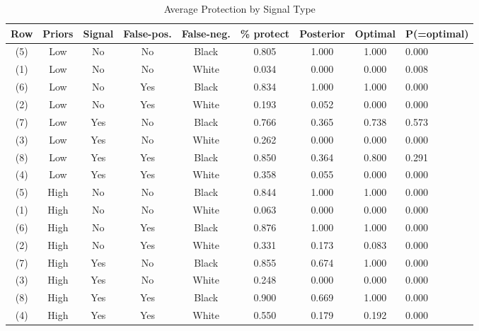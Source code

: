 \begin{table}[H]\centering \footnotesize \caption{Average Protection by Signal Type} \begin{tabular}{cccccccc} \hline \hline
\textbf{Row}&\textbf{Priors}&\textbf{Signal}&\textbf{False-pos.}&\textbf{False-neg.}&\textbf{\% protect}& \textbf{Posterior} & \textbf{Optimal} & \textbf{P(=optimal)} \\ \hline
(5)&Low&No&No&Black&0.805&1.000&1.000&0.000\\
(1)&Low&No&No&White&0.034&0.000&0.000&0.008\\
(6)&Low&No&Yes&Black&0.834&1.000&1.000&0.000\\
(2)&Low&No&Yes&White&0.193&0.052&0.000&0.000\\
(7)&Low&Yes&No&Black&0.766&0.365&0.738&0.573\\
(3)&Low&Yes&No&White&0.262&0.000&0.000&0.000\\
(8)&Low&Yes&Yes&Black&0.850&0.364&0.800&0.291\\
(4)&Low&Yes&Yes&White&0.358&0.055&0.000&0.000\\
(5)&High&No&No&Black&0.844&1.000&1.000&0.000\\
(1)&High&No&No&White&0.063&0.000&0.000&0.000\\
(6)&High&No&Yes&Black&0.876&1.000&1.000&0.000\\
(2)&High&No&Yes&White&0.331&0.173&0.083&0.000\\
(7)&High&Yes&No&Black&0.855&0.674&1.000&0.000\\
(3)&High&Yes&No&White&0.248&0.000&0.000&0.000\\
(8)&High&Yes&Yes&Black&0.900&0.669&1.000&0.000\\
(4)&High&Yes&Yes&White&0.550&0.179&0.192&0.000\\
\hline \end{tabular} \end{table}
